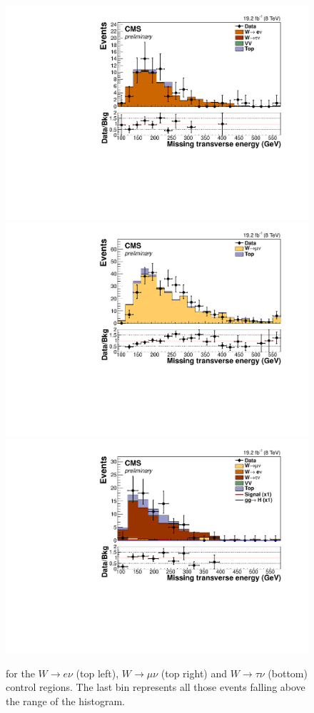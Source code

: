 \begin{figure}[h!]
\centering
\includegraphics[width=.49\textwidth]{Chapter07/Images/output_sigreg/enu_metnomuons.pdf}
\includegraphics[width=.49\textwidth]{Chapter07/Images/output_sigreg/munu_metnomuons.pdf} \\
\includegraphics[width=.49\textwidth]{Chapter07/Images/output_sigreg/taunu_metnomuons.pdf}
\caption{\MET for the $W\rightarrow e\nu$ (top left), $W\rightarrow\mu\nu$ (top right) and $W\rightarrow\tau\nu$ (bottom) control regions. The last bin represents all those events falling above the range of the histogram.}
\label{fig:wmetcontplots}
\end{figure}


